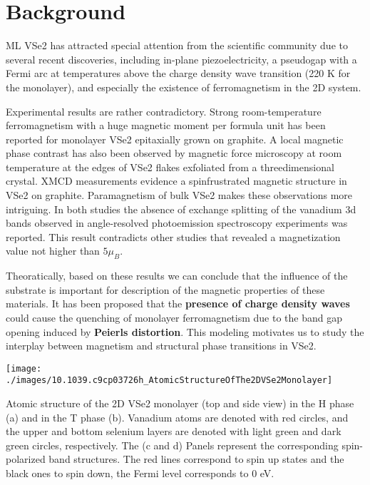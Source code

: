 \section{Background}
ML VSe2 has attracted special attention from the scientific community due to several recent discoveries, including in-plane piezoelectricity, a pseudogap with a Fermi arc at temperatures above the charge density wave transition (220 K for the monolayer), and especially the existence of ferromagnetism in the 2D system. 

Experimental results are rather contradictory. Strong room-temperature ferromagnetism with a huge magnetic moment per formula unit has been reported for monolayer VSe2
epitaxially grown on graphite. A local magnetic phase contrast has also been observed by magnetic force microscopy at room temperature at the edges of VSe2 flakes exfoliated from a threedimensional crystal. XMCD measurements evidence a spinfrustrated magnetic structure in VSe2 on graphite. Paramagnetism of bulk VSe2 makes these observations more intriguing. In both studies the absence of exchange splitting of the vanadium 3d bands observed in angle-resolved photoemission spectroscopy experiments was reported. This result contradicts other studies that revealed a magnetization value not higher than $5 \mu_B$.

Theoratically, based on these results we can conclude that the influence of the substrate is important for description of the magnetic properties of these materials. It has been proposed that the \textbf{presence of charge density waves} could cause the quenching of monolayer ferromagnetism due to the band gap opening induced by \textbf{Peierls distortion}. This modeling motivates us to study the interplay between magnetism and structural phase transitions in VSe2.

\begin{marginfigure}
    \texttt{[image: ./images/10.1039.c9cp03726h\_AtomicStructureOfThe2DVSe2Monolayer]}
	\caption[Atomic structure of the 2D VSe2 monolayer in the H phase and in the T phase.]{
        Atomic structure of the 2D VSe2 monolayer (top and side view) in the H phase (a) and in the T phase (b). Vanadium atoms are denoted with red circles, and the upper and bottom selenium layers are denoted with light green and dark green circles, respectively. The (c and d) Panels represent the corresponding spin-polarized band structures. The red lines correspond to spin up states and the black ones to spin down, the Fermi level corresponds to 0 eV.
	}
\end{marginfigure}
